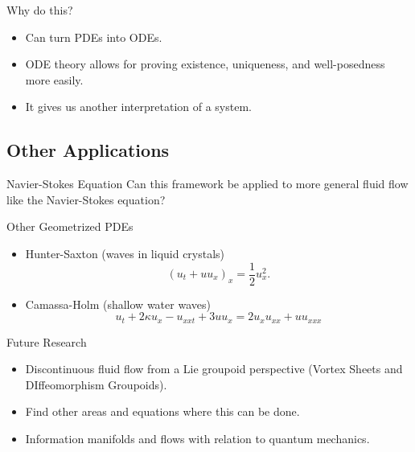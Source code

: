 \documentclass[usenames,dvipsnames]{beamer}
\theoremstyle{definition}
\theoremstyle{theorem}
\begin{document}
        \begin{frame}{Why do this?}
            \begin{itemize}
                \item Can turn PDEs into ODEs.
                \item ODE theory allows for proving existence, uniqueness, and well-posedness more easily.
                \item It gives us another interpretation of a system.
            \end{itemize}
        \end{frame}
        
    \subsection{Other Applications}
        
        \begin{frame}{Navier-Stokes Equation}
            Can this framework be applied to more general fluid flow like the Navier-Stokes equation?
        \end{frame}
        
        \begin{frame}{Other Geometrized PDEs}
            \begin{itemize}
                \item Hunter-Saxton (waves in liquid crystals)
                \[
                (u_t+uu_x)_x=\frac{1}{2}u_x^2.
                \]
                \item Camassa-Holm (shallow water waves)
                \[
                u_t+2\kappa u_x - u_{xxt}+3uu_x=2u_xu_{xx}+uu_{xxx}
                \]
            \end{itemize}
        \end{frame}
        
        \begin{frame}{Future Research}
        \begin{itemize}
            \item Discontinuous fluid flow from a Lie groupoid perspective (Vortex Sheets and DIffeomorphism Groupoids).
            \item Find other areas and equations where this can be done.  
            \item Information manifolds and flows with relation to quantum mechanics.
        \end{itemize}
        \end{frame}
        
        
        
\end{document}
